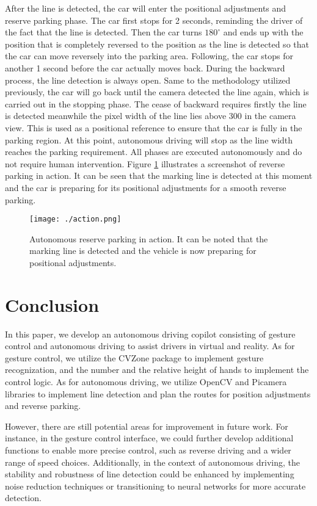 \documentclass[acmsmall]{acmart}
\begin{document}
After the line is detected, the car will enter the positional adjustments and reserve parking phase. The car first stops for 2 seconds, reminding the driver of the fact that the line is detected. Then the car turns $180^\circ$ and ends up with the position that is completely reversed to the position as the line is detected so that the car can move reversely into the parking area. Following, the car stops for another 1 second before the car actually moves back. During the backward process, the line detection is always open. Same to the methodology utilized previously, the car will go back until the camera detected the line again, which is carried out in the stopping phase. The cease of backward requires firstly the line is detected meanwhile the pixel width of the line lies above 300 in the camera view. This is used as a positional reference to ensure that the car is fully in the parking region. At this point, autonomous driving will stop as the line width reaches the parking requirement. All phases are executed autonomously and do not require human intervention. Figure \ref{fig:ato} illustrates a screenshot of reverse parking in action. It can be seen that the marking line is detected at this moment and the car is preparing for its positional adjustments for a smooth reverse parking.

\begin{figure}[!ht]
    \centering
    \texttt{[image: ./action.png]}
    \caption{Autonomous reserve parking in action. It can be noted that the marking line is detected and the vehicle is now preparing for positional adjustments.}
    \label{fig:ato}
\end{figure}

\section{Conclusion}

In this paper, we develop an autonomous driving copilot consisting of gesture control and autonomous driving to assist drivers in virtual and reality. As for gesture control, we utilize the CVZone package to implement gesture recognization, and the number and the relative height of hands to implement the control logic. As for autonomous driving, we utilize OpenCV and Picamera libraries to implement line detection and plan the routes for position adjustments and reverse parking. 

However, there are still potential areas for improvement in future work. For instance, in the gesture control interface, we could further develop additional functions to enable more precise control, such as reverse driving and a wider range of speed choices. Additionally, in the context of autonomous driving, the stability and robustness of line detection could be enhanced by implementing noise reduction techniques or transitioning to neural networks for more accurate detection.



\end{document}
